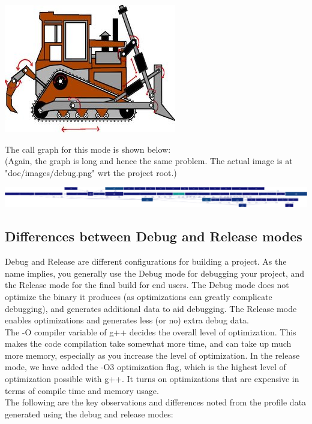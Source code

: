 \documentclass[11pt]{article}
\begin{document}
\begin{center} 
\includegraphics [scale=1.1]{./images/original.jpg} 
\end{center}

The call graph for this mode is shown below: \\
(Again, the graph is long and hence the same problem. The actual image is at "doc/images/debug.png" wrt the project root.)

\begin{center} 
\includegraphics [scale=0.07]{./images/debug_100000.png} 
\end{center}

\subsection{Differences between Debug and Release modes}
Debug and Release are different configurations for building a project. As the name implies, you generally use the Debug mode for debugging your project, and the Release mode for the final build for end users. The Debug mode does not optimize the binary it produces (as optimizations can greatly complicate debugging), and generates additional data to aid debugging. The Release mode enables optimizations and generates less (or no) extra debug data. \\
The -O compiler variable of g++ decides the overall level of optimization. This makes the code compilation take somewhat more time, and can take up much more memory, especially as you increase the level of optimization. 
In the release mode, we have added the -O3 optimization flag, which is the highest level of optimization possible with g++. It turns on optimizations that are expensive in terms of compile time and memory usage. \\
The following are the key observations and differences noted from the profile data generated using the debug and release modes:  \\
\end{document}
